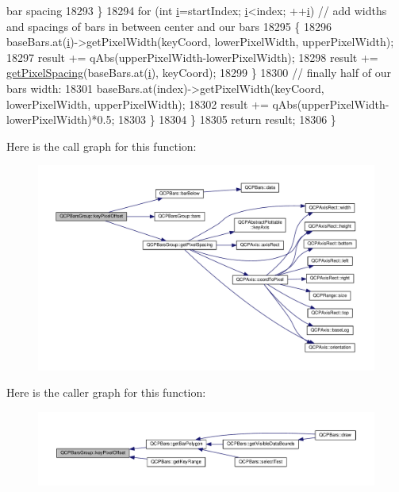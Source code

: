 \begin{DoxyCode}
{       bar spacing}
18293       \}
18294       \textcolor{keywordflow}{for} (\textcolor{keywordtype}{int} \hyperlink{_comparision_pictures_2_createtest_image_8m_a6f6ccfcf58b31cb6412107d9d5281426}{i}=startIndex; \hyperlink{_comparision_pictures_2_createtest_image_8m_a6f6ccfcf58b31cb6412107d9d5281426}{i}<index; ++\hyperlink{_comparision_pictures_2_createtest_image_8m_a6f6ccfcf58b31cb6412107d9d5281426}{i}) \textcolor{comment}{// add widths and spacings of bars in between center and our
       bars}
18295       \{
18296         baseBars.at(\hyperlink{_comparision_pictures_2_createtest_image_8m_a6f6ccfcf58b31cb6412107d9d5281426}{i})->getPixelWidth(keyCoord, lowerPixelWidth, upperPixelWidth);
18297         result += qAbs(upperPixelWidth-lowerPixelWidth);
18298         result += \hyperlink{class_q_c_p_bars_group_a0beccd41bc3841a4c5b284823bc7d2de}{getPixelSpacing}(baseBars.at(\hyperlink{_comparision_pictures_2_createtest_image_8m_a6f6ccfcf58b31cb6412107d9d5281426}{i}), keyCoord);
18299       \}
18300       \textcolor{comment}{// finally half of our bars width:}
18301       baseBars.at(index)->getPixelWidth(keyCoord, lowerPixelWidth, upperPixelWidth);
18302       result += qAbs(upperPixelWidth-lowerPixelWidth)*0.5;
18303     \}
18304   \}
18305   \textcolor{keywordflow}{return} result;
18306 \}
\end{DoxyCode}


Here is the call graph for this function\+:\nopagebreak
\begin{figure}[H]
\begin{center}
\leavevmode
\includegraphics[width=350pt]{class_q_c_p_bars_group_a8e2ca6002e7bab49670144d048a2bcc9_cgraph}
\end{center}
\end{figure}




Here is the caller graph for this function\+:\nopagebreak
\begin{figure}[H]
\begin{center}
\leavevmode
\includegraphics[width=350pt]{class_q_c_p_bars_group_a8e2ca6002e7bab49670144d048a2bcc9_icgraph}
\end{center}
\end{figure}


